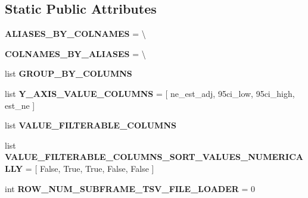 \subsection*{Static Public Attributes}
\begin{DoxyCompactItemize}
\item 
{\bfseries A\+L\+I\+A\+S\+E\+S\+\_\+\+B\+Y\+\_\+\+C\+O\+L\+N\+A\+M\+ES} = \textbackslash{}\hypertarget{classnegui_1_1pgnebox_1_1PGNeEstimationBoxplotInterface_a7428356efbf0e50d82f49980c039d8c3}{}\label{classnegui_1_1pgnebox_1_1PGNeEstimationBoxplotInterface_a7428356efbf0e50d82f49980c039d8c3}

\item 
{\bfseries C\+O\+L\+N\+A\+M\+E\+S\+\_\+\+B\+Y\+\_\+\+A\+L\+I\+A\+S\+ES} = \textbackslash{}\hypertarget{classnegui_1_1pgnebox_1_1PGNeEstimationBoxplotInterface_a94857bbbb0449b1f26390e9b133893dc}{}\label{classnegui_1_1pgnebox_1_1PGNeEstimationBoxplotInterface_a94857bbbb0449b1f26390e9b133893dc}

\item 
list {\bfseries G\+R\+O\+U\+P\+\_\+\+B\+Y\+\_\+\+C\+O\+L\+U\+M\+NS}
\item 
list {\bfseries Y\+\_\+\+A\+X\+I\+S\+\_\+\+V\+A\+L\+U\+E\+\_\+\+C\+O\+L\+U\+M\+NS} = \mbox{[} \textquotesingle{}ne\+\_\+est\+\_\+adj\textquotesingle{}, \textquotesingle{}95ci\+\_\+low\textquotesingle{}, \textquotesingle{}95ci\+\_\+high\textquotesingle{}, \textquotesingle{}est\+\_\+ne\textquotesingle{} \mbox{]}\hypertarget{classnegui_1_1pgnebox_1_1PGNeEstimationBoxplotInterface_a245592a90ccce4352ec09edb02d47d77}{}\label{classnegui_1_1pgnebox_1_1PGNeEstimationBoxplotInterface_a245592a90ccce4352ec09edb02d47d77}

\item 
list {\bfseries V\+A\+L\+U\+E\+\_\+\+F\+I\+L\+T\+E\+R\+A\+B\+L\+E\+\_\+\+C\+O\+L\+U\+M\+NS}
\item 
list {\bfseries V\+A\+L\+U\+E\+\_\+\+F\+I\+L\+T\+E\+R\+A\+B\+L\+E\+\_\+\+C\+O\+L\+U\+M\+N\+S\+\_\+\+S\+O\+R\+T\+\_\+\+V\+A\+L\+U\+E\+S\+\_\+\+N\+U\+M\+E\+R\+I\+C\+A\+L\+LY} = \mbox{[} False, True, True, False, False \mbox{]}\hypertarget{classnegui_1_1pgnebox_1_1PGNeEstimationBoxplotInterface_abe9672ffba74fcf0be240b4aa3417050}{}\label{classnegui_1_1pgnebox_1_1PGNeEstimationBoxplotInterface_abe9672ffba74fcf0be240b4aa3417050}

\item 
int {\bfseries R\+O\+W\+\_\+\+N\+U\+M\+\_\+\+S\+U\+B\+F\+R\+A\+M\+E\+\_\+\+T\+S\+V\+\_\+\+F\+I\+L\+E\+\_\+\+L\+O\+A\+D\+ER} = 0\hypertarget{classnegui_1_1pgnebox_1_1PGNeEstimationBoxplotInterface_ab53894b7d86497273eaa38500e8fed6a}{}\label{classnegui_1_1pgnebox_1_1PGNeEstimationBoxplotInterface_ab53894b7d86497273eaa38500e8fed6a}


\end{DoxyCompactItemize}
